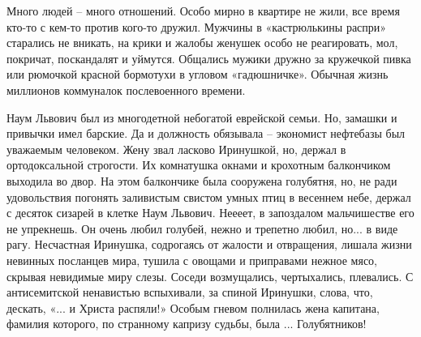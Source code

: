 Много людей – много отношений. Особо мирно в квартире не жили, все время кто-то
с кем-то против кого-то дружил. Мужчины в «кастрюлькины распри» старались не
вникать, на крики и жалобы женушек особо не реагировать, мол, покричат,
поскандалят и уймутся. Общались мужики дружно за кружечкой пивка или рюмочкой
красной бормотухи в угловом «гадюшничке». Обычная жизнь миллионов коммуналок
послевоенного времени.

Наум Львович был из многодетной небогатой еврейской семьи. Но, замашки и
привычки имел барские. Да и должность обязывала – экономист нефтебазы был
уважаемым человеком. Жену звал ласково Иринушкой, но, держал в ортодоксальной
строгости. Их комнатушка окнами и крохотным балкончиком выходила во двор. На
этом балкончике была сооружена голубятня, но, не ради удовольствия погонять
заливистым свистом умных птиц в весеннем небе, держал с десяток сизарей в
клетке Наум Львович. Неееет, в запоздалом мальчишестве его не упрекнешь. Он
очень любил голубей, нежно и трепетно любил, но... в виде рагу. Несчастная
Иринушка, содрогаясь от жалости и отвращения, лишала жизни невинных посланцев
мира, тушила с овощами и приправами нежное мясо, скрывая невидимые миру слезы.
Соседи возмущались, чертыхались, плевались. С антисемитской ненавистью
вспыхивали, за спиной Иринушки, слова, что, дескать, «... и Христа распяли!»
Особым гневом полнилась жена капитана, фамилия которого, по странному капризу
судьбы, была ... Голубятников!

